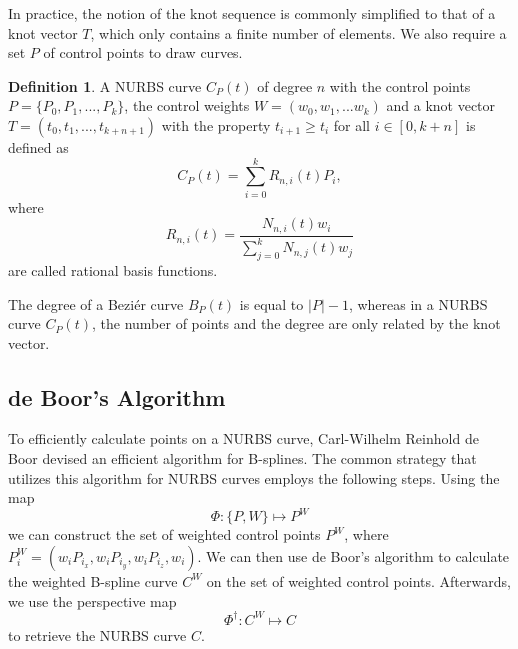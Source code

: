 \documentclass[a4paper, 11pt]{report}
\theoremstyle{definition}
\newtheorem{definition}{Definition}[section]
\begin{document}
In practice, the notion of the knot sequence is commonly simplified to that of a knot vector $T$, which only contains a finite number of elements. We also require a set $P$ of control points to draw curves.

\begin{definition}
	A NURBS curve $C_P(t)$ of degree $n$ with the control points $P = \{P_0, P_1, ..., P_k\}$, the control weights $W = (w_0, w_1, ... w_k)$ and a knot vector $T = (t_0, t_1, ..., t_{k+n+1})$ with the property $t_{i+1} \geq t_{i}$ for all $i \in [0, k+n]$ is defined as
	\begin{equation}
		C_P(t) = \sum_{i=0}^k R_{n,i}(t)P_i,
	\end{equation}
	where
	\begin{equation}
		R_{n,i}(t) = \frac{N_{n,i}(t)w_i}{\sum_{j=0}^k N_{n,j}(t) w_j}
	\end{equation}
	are called rational basis functions.
\end{definition}

The degree of a Beziér curve $B_P(t)$ is equal to $|P|-1$, whereas in a NURBS curve $C_P(t)$, the number of points and the degree are only related by the knot vector.

\subsection{de Boor's Algorithm}
To efficiently calculate points on a NURBS curve, Carl-Wilhelm Reinhold de Boor devised an efficient algorithm for B-splines. The common strategy that utilizes this algorithm for NURBS curves employs the following steps. Using the map 
	$$\Phi: \{P, W\} \mapsto P^W$$
we can construct the set of weighted control points $P^W$, where $P^W_i = (w_i P_{i_x}, w_i P_{i_y}, w_i P_{i_z}, w_i)$. We can then use de Boor's algorithm to calculate the weighted B-spline curve $C^W$ on the set of weighted control points. Afterwards, we use the perspective map 
	$$\Phi^\dagger: C^W \mapsto C$$ 
to retrieve the NURBS curve $C$.
\end{document}
